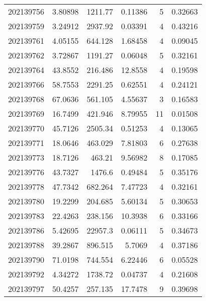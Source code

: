 \begin{tabular}{rrrrrr}
 202139756 &          3.80898 &     1211.77   &            0.11386 &           5 & 0.32663 \\
 202139759 &          3.24912 &     2937.92   &            0.03391 &           4 & 0.43216 \\
 202139761 &          4.05155 &      644.128  &            1.68458 &           4 & 0.09045 \\
 202139762 &          3.72867 &     1191.27   &            0.06048 &           5 & 0.32161 \\
 202139764 &         43.8552  &      216.486  &           12.8558  &           4 & 0.19598 \\
 202139766 &         58.7553  &     2291.25   &            0.62551 &           4 & 0.24121 \\
 202139768 &         67.0636  &      561.105  &            4.55637 &           3 & 0.16583 \\
 202139769 &         16.7499  &      421.946  &            8.79955 &          11 & 0.01508 \\
 202139770 &         45.7126  &     2505.34   &            0.51253 &           4 & 0.13065 \\
 202139771 &         18.0646  &      463.029  &            7.81803 &           6 & 0.27638 \\
 202139773 &         18.7126  &      463.21   &            9.56982 &           8 & 0.17085 \\
 202139776 &         43.7327  &     1476.6    &            0.49484 &           5 & 0.35176 \\
 202139778 &         47.7342  &      682.264  &            7.47723 &           4 & 0.32161 \\
 202139780 &         19.2299  &      204.685  &            5.60134 &           5 & 0.30653 \\
 202139783 &         22.4263  &      238.156  &           10.3938  &           6 & 0.33166 \\
 202139786 &          5.42695 &    22957.3    &            0.06111 &           5 & 0.34673 \\
 202139788 &         39.2867  &      896.515  &            5.7069  &           4 & 0.37186 \\
 202139790 &         71.0198  &      744.554  &            6.22446 &           6 & 0.05528 \\
 202139792 &          4.34272 &     1738.72   &            0.04737 &           4 & 0.21608 \\
 202139797 &         50.4257  &      257.135  &           17.7478  &           9 & 0.39698 \\

\end{tabular}
